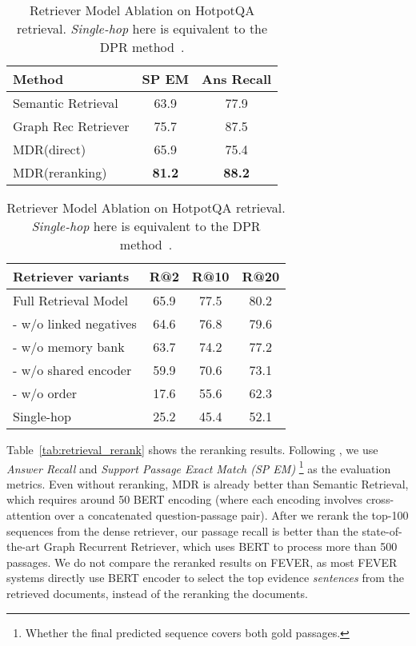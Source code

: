 \documentclass{article} \usepackage{iclr2021_conference,times}
\newcommand{\method}{MDR\xspace}
\begin{document}
\begin{table}[h]
    \vspace{-0.20in}
    \begin{minipage}[t]{.45\textwidth}
    \centering
\small
    \caption{HotpotQA reranked retrieval results (input passages for final answer prediction).}
    \begin{tabular}{lcc}
    \toprule
    Method & SP EM & Ans Recall \\
    \midrule
    Semantic Retrieval  & 63.9 & 77.9 \\
    Graph Rec Retriever & 75.7 & 87.5 \\
    \midrule 
    \method (direct)     & 65.9 & 75.4 \\
    \method (reranking) & \textbf{81.2} & \textbf{88.2} \\
    \bottomrule
    \end{tabular}
    \label{tab:retrieval_rerank}
    \end{minipage}\hfill
    \begin{minipage}[t]{.5\textwidth}
    \centering
    \small
    \caption{Retriever Model Ablation on HotpotQA retrieval. \emph{Single-hop} here is equivalent to the DPR method~\citep{DPR}.}
    \begin{tabular}{l|ccc}
    \toprule
    Retriever variants & R@2 & R@10 & R@20 \\
    \midrule
    Full Retrieval Model & 65.9 & 77.5 & 80.2 \\
    - w/o linked negatives & 64.6 & 76.8 & 79.6\\
    - w/o memory bank & 63.7 & 74.2 & 77.2\\
    - w/o shared encoder & 59.9 & 70.6 & 73.1 \\
- w/o order & 17.6 & 55.6 & 62.3\\
    Single-hop & 25.2 & 45.4 & 52.1\\
\bottomrule
    \end{tabular}
    \label{tab:ablation}
    \end{minipage}
\end{table}
 
Table~\ref{tab:retrieval_rerank} shows the reranking results. 
Following \citet{GraphRecurrentRetriever}, we use \emph{Answer Recall} and \emph{Support Passage Exact Match (SP EM)} \footnote{Whether the final predicted sequence covers both gold passages.} as the evaluation metrics.
Even without reranking, \method is already better than Semantic Retrieval, which requires around 50 BERT encoding (where each encoding involves cross-attention over a concatenated question-passage pair). After we rerank the top-100 sequences from the dense retriever, our passage recall is better than the state-of-the-art Graph Recurrent Retriever, which uses BERT to process more than 500 passages. 
We do not compare the reranked results on FEVER, as most FEVER systems directly use BERT encoder to select the top evidence \textit{sentences} from the retrieved documents, instead of the reranking the documents.
\end{document}
